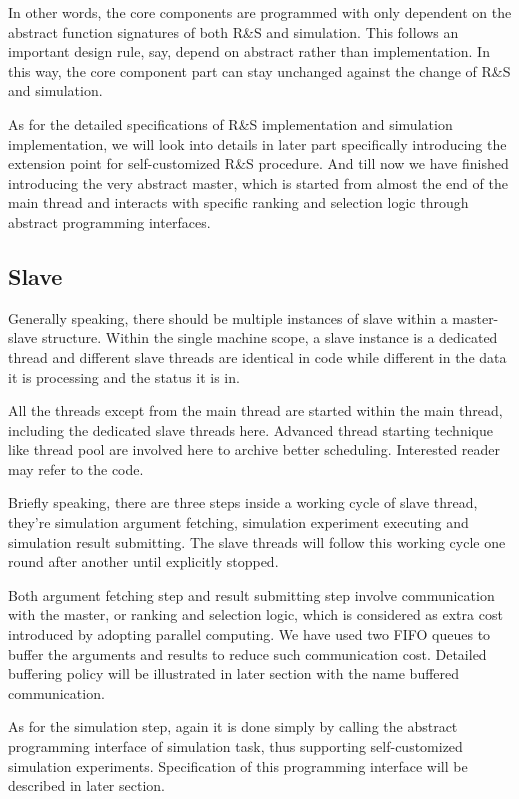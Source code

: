 \documentclass[12pt,a4]{report}
\begin{document}
In other words, the core components are programmed with only dependent on the abstract function signatures of both R\&S and simulation. This follows an important design rule, say, depend on abstract rather than implementation. In this way, the core component part can stay unchanged against the change of R\&S and simulation.

As for the detailed specifications of R\&S implementation and simulation implementation, we will look into details in later part specifically introducing the extension point for self-customized R\&S procedure. And till now we have finished introducing the very abstract master, which is started from almost the end of the main thread and interacts with specific ranking and selection logic through abstract programming interfaces.

\subsection{Slave}

Generally speaking, there should be multiple instances of slave within a master-slave structure. Within the single machine scope, a slave instance is a dedicated thread and different slave threads are identical in code while different in the data it is processing and the status it is in.

All the threads except from the main thread are started within the main thread, including the dedicated slave threads here. Advanced thread starting technique like thread pool are involved here to archive better scheduling. Interested reader may refer to the code.

Briefly speaking, there are three steps inside a working cycle of slave thread, they're simulation argument fetching, simulation experiment executing and simulation result submitting. The slave threads will follow this working cycle one round after another until explicitly stopped.

Both argument fetching step and result submitting step involve communication with the master, or ranking and selection logic, which is considered as extra cost introduced by adopting parallel computing. We have used two FIFO queues to buffer the arguments and results to reduce such communication cost. Detailed buffering policy will be illustrated in later section with the name buffered communication.

As for the simulation step, again it is done simply by calling the abstract programming interface of simulation task, thus supporting self-customized simulation experiments. Specification of this programming interface will be described in later section.
\end{document}
